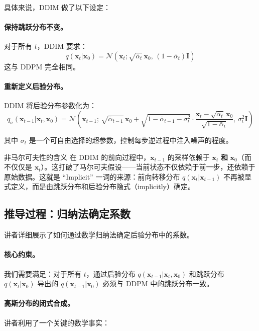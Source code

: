 \documentclass[a4paper]{article}
\begin{document}
具体来说，DDIM 做了以下设定：

\paragraph{保持跳跃分布不变。} 对于所有 $t$，DDIM 要求：
$$
q(\mathbf{x}_t | \mathbf{x}_0) = \mathcal{N}(\mathbf{x}_t; \sqrt{\bar{\alpha}_t}\,\mathbf{x}_0,\, (1-\bar{\alpha}_t)\mathbf{I})
$$
这与 DDPM 完全相同。

\paragraph{重新定义后验分布。} DDIM 将后验分布参数化为：
$$
q_\sigma(\mathbf{x}_{t-1} | \mathbf{x}_t, \mathbf{x}_0) = \mathcal{N}\left(\mathbf{x}_{t-1};\, \sqrt{\bar{\alpha}_{t-1}}\,\mathbf{x}_0 + \sqrt{1-\bar{\alpha}_{t-1}-\sigma_t^2}\cdot\frac{\mathbf{x}_t - \sqrt{\bar{\alpha}_t}\,\mathbf{x}_0}{\sqrt{1-\bar{\alpha}_t}},\, \sigma_t^2\mathbf{I}\right)
$$

其中 $\sigma_t$ 是一个可自由选择的超参数，控制每步逆过程中注入噪声的程度。

\begin{warningbox}{非马尔可夫性的含义}
在 DDIM 的前向过程中，$\mathbf{x}_{t-1}$ 的采样依赖于 $\mathbf{x}_t$ \textbf{和} $\mathbf{x}_0$（而不仅仅是 $\mathbf{x}_t$）。这打破了马尔可夫假设——当前状态不仅依赖于前一步，还依赖于原始数据。这就是 ``Implicit'' 一词的来源：前向转移分布 $q(\mathbf{x}_t|\mathbf{x}_{t-1})$ 不再被显式定义，而是由跳跃分布和后验分布隐式（implicitly）确定。
\end{warningbox}

\subsection{推导过程：归纳法确定系数}

讲者详细展示了如何通过数学归纳法确定后验分布中的系数。

\paragraph{核心约束。} 我们需要满足：对于所有 $t$，通过后验分布 $q(\mathbf{x}_{t-1}|\mathbf{x}_t, \mathbf{x}_0)$ 和跳跃分布 $q(\mathbf{x}_t|\mathbf{x}_0)$ 导出的 $q(\mathbf{x}_{t-1}|\mathbf{x}_0)$ 必须与 DDPM 中的跳跃分布一致。

\paragraph{高斯分布的闭式合成。} 讲者利用了一个关键的数学事实：
\end{document}
